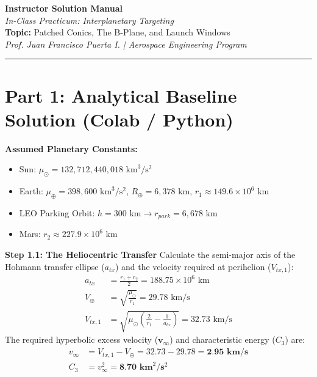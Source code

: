 \documentclass[11pt, letterpaper]{article}
\begin{document}
\begin{center}
    {\Large \textbf{Instructor Solution Manual}} \\
    \vspace{0.2cm}
    {\large \textit{In-Class Practicum: Interplanetary Targeting}} \\
    \vspace{0.4cm}
    \textbf{Topic:} Patched Conics, The B-Plane, and Launch Windows \\
    \textit{Prof. Juan Francisco Puerta I. | Aerospace Engineering Program}
\end{center}

\hrule
\vspace{0.5cm}

\section*{Part 1: Analytical Baseline Solution (Colab / Python)}

\textbf{Assumed Planetary Constants:}
\begin{itemize}
    \item Sun: $\mu_\odot = 132,712,440,018 \text{ km}^3/\text{s}^2$
    \item Earth: $\mu_\oplus = 398,600 \text{ km}^3/\text{s}^2$, $R_\oplus = 6,378 \text{ km}$, $r_1 \approx 149.6 \times 10^6 \text{ km}$
    \item LEO Parking Orbit: $h = 300 \text{ km} \rightarrow r_{park} = 6,678 \text{ km}$
    \item Mars: $r_2 \approx 227.9 \times 10^6 \text{ km}$
\end{itemize}

\textbf{Step 1.1: The Heliocentric Transfer}
Calculate the semi-major axis of the Hohmann transfer ellipse ($a_{tx}$) and the velocity required at perihelion ($V_{tx,1}$):
\begin{align*}
    a_{tx} &= \frac{r_1 + r_2}{2} = 188.75 \times 10^6 \text{ km} \\
    V_\oplus &= \sqrt{\frac{\mu_\odot}{r_1}} = 29.78 \text{ km/s} \\
    V_{tx,1} &= \sqrt{\mu_\odot \left( \frac{2}{r_1} - \frac{1}{a_{tx}} \right)} = 32.73 \text{ km/s}
\end{align*}
The required hyperbolic excess velocity ($\boldsymbol{v}_\infty$) and characteristic energy ($C_3$) are:
\begin{align*}
    v_\infty &= V_{tx,1} - V_\oplus = 32.73 - 29.78 = \textbf{2.95 km/s} \\
    C_3 &= v_\infty^2 = \textbf{8.70 km}^2/\textbf{s}^2
\end{align*}
\end{document}
